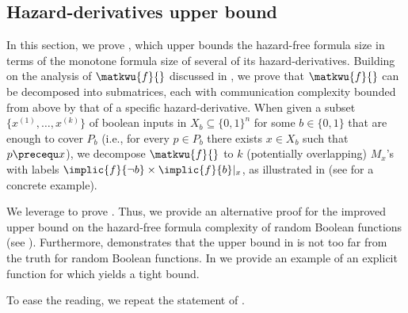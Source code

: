 \documentclass[acmsmall, nonacm, authorversion]{acmart}
\begin{document}
\subsection{Hazard-derivatives upper bound}\label{subsec:hazard-derivative-upper-bound}
In this section, we prove , which upper bounds the hazard-free formula size in terms of the monotone formula size of several of its hazard-derivatives.
Building on the analysis of $\matkwu{f}{}$ discussed in , we prove that $\matkwu{f}{}$ can be decomposed into submatrices, each with communication complexity bounded from above by that of a specific hazard-derivative. When given a subset $\{x^{(1)},\dots,x^{(k)}\}$ of boolean inputs in $X_b\subseteq \{0,1\}^n$ for some $b\in\{0,1\}$ that are enough to cover $P_b$ (i.e., for every $p\in P_b$ there exists $x\in X_b$ such that $p\precequ x$), we decompose $\matkwu{f}{}$ to $k$ (potentially overlapping) $M_{x}$'s with labels $\implic{f}{\neg b}\times\implic{f}{b}|_x$, as illustrated in  (see  for a concrete example).

We leverage  to prove . Thus, we provide an alternative proof for the improved upper bound on the hazard-free formula complexity of random Boolean functions (see ).
Furthermore,  demonstrates that the upper bound in  is not too far from the truth for random Boolean functions. In  we provide an example of an explicit function for which  yields a tight bound. 

To ease the reading, we repeat the statement of .

\thmderivativesupperbound*
\end{document}

